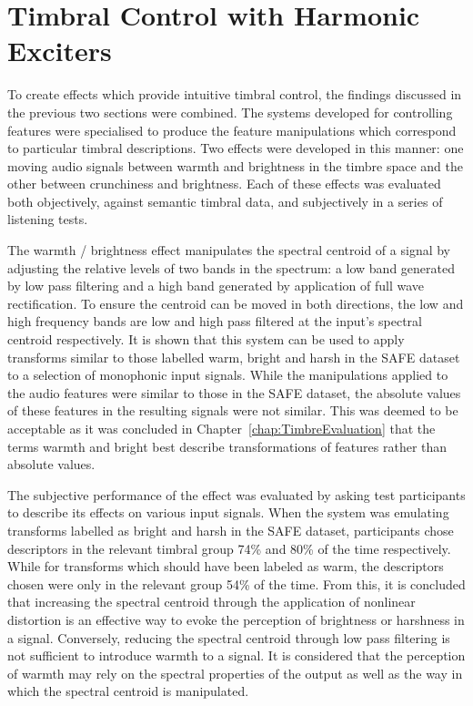 \section{Timbral Control with Harmonic Exciters}
\label{sec:Conclusion-TimbralControl}
	To create effects which provide intuitive timbral control, the findings discussed in the previous two sections were
	combined. The systems developed for controlling features were specialised to produce the feature manipulations which
	correspond to particular timbral descriptions. Two effects were developed in this manner: one moving audio signals
	between warmth and brightness in the timbre space and the other between crunchiness and brightness. Each of these
	effects was evaluated both objectively, against semantic timbral data, and subjectively in a series of listening
	tests.

	The warmth / brightness effect manipulates the spectral centroid of a signal by adjusting the relative levels of two
	bands in the spectrum: a low band generated by low pass filtering and a high band generated by application of full
	wave rectification. To ensure the centroid can be moved in both directions, the low and high frequency bands are low
	and high pass filtered at the input's spectral centroid respectively. It is shown that this system can be used to
	apply transforms similar to those labelled warm, bright and harsh in the SAFE dataset to a selection of monophonic
	input signals. While the manipulations applied to the audio features were similar to those in the SAFE dataset, the
	absolute values of these features in the resulting signals were not similar. This was deemed to be acceptable as it
	was concluded in Chapter~\ref{chap:TimbreEvaluation} that the terms warmth and bright best describe transformations
	of features rather than absolute values.

	The subjective performance of the effect was evaluated by asking test participants to describe its effects on
	various input signals. When the system was emulating transforms labelled as bright and harsh in the SAFE dataset,
	participants chose descriptors in the relevant timbral group 74\% and 80\% of the time respectively. While for
	transforms which should have been labeled as warm, the descriptors chosen were only in the relevant group 54\% of
	the time. From this, it is concluded that increasing the spectral centroid through the application of nonlinear
	distortion is an effective way to evoke the perception of brightness or harshness in a signal. Conversely, reducing
	the spectral centroid through low pass filtering is not sufficient to introduce warmth to a signal. It is considered
	that the perception of warmth may rely on the spectral properties of the output as well as the way in which the
	spectral centroid is manipulated.

